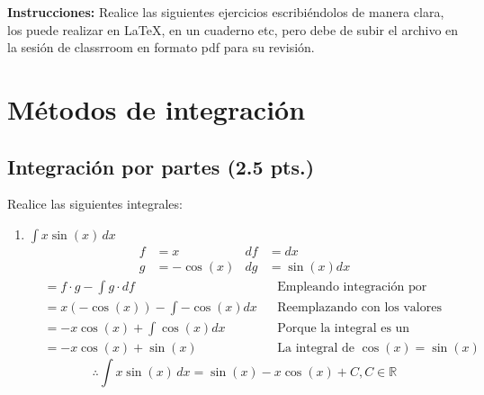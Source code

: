 \documentclass[letterpaper]{article}
\newcommand{\R}{\mathds{R}}
\renewcommand{\*}{\cdot}
\theoremstyle{definition}
\begin{document}
	\noindent \textbf{Instrucciones:} Realice las siguientes ejercicios escribiéndolos  de manera clara, los puede realizar en \LaTeX, en un cuaderno etc, pero debe de subir el archivo en la sesión de classrroom en formato pdf para su revisión.
	
		
		
		
		\section*{Métodos de integración}
		
		\subsection*{Integración por partes (2.5 pts.)}
		\item Realice las siguientes integrales:
		\begin{enumerate}
			\item$\displaystyle \int x \sin(x) \, dx$
			\begin{align*}
				f &= x & df &= dx\\
				g &= -\cos(x) & dg &= \sin(x)dx
			\end{align*}
			\begin{align*}
				&= f \* g - \int g\*df &&\text{Empleando integración por partes}\\
				&= x(-\cos(x)) - \int -\cos(x)dx &&\text{Reemplazando con los valores elegidos}\\
				&= -x\cos(x) + \int \cos(x)dx &&\text{Porque la integral es un operador lineal}\\
				&= -x\cos(x) + \sin(x) &&\text{La integral de }\cos(x) = \sin(x)
			\end{align*}
			\[ \therefore \int x \sin(x) \, dx = \sin(x) - x\cos(x) + C, C \in \R  \]

	\end{enumerate}
	
	
	
	
\end{document}
